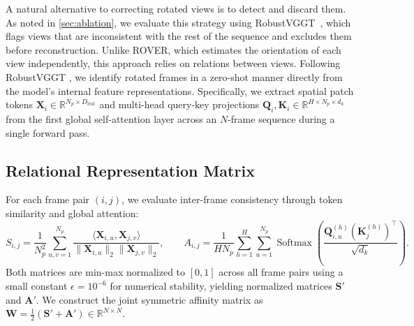 A natural alternative to correcting rotated views is to detect and discard them. As noted in \cref{sec:ablation}, we evaluate this strategy using RobustVGGT~\citep{robustvggt}, which flags views that are inconsistent with the rest of the sequence and excludes them before reconstruction. Unlike ROVER, which estimates the orientation of each view independently, this approach relies on relations between views. Following  RobustVGGT , we identify rotated frames in a zero-shot manner directly from the model's internal feature representations. Specifically, we extract spatial patch tokens $\mathbf{X}_i \in \mathbb{R}^{N_p \times D_{\text{feat}}}$ and multi-head query-key projections $\mathbf{Q}_i, \mathbf{K}_i \in \mathbb{R}^{H \times N_p \times d_k}$ from the first global self-attention layer across an $N$-frame sequence during a single forward pass.

\subsection{Relational Representation Matrix}
For each frame pair $(i, j)$, we evaluate inter-frame consistency through token similarity and global attention:
\begin{equation}
S_{i,j} = \frac{1}{N_p^2} \sum_{u,v=1}^{N_p} \frac{\langle \mathbf{X}_{i,u}, \mathbf{X}_{j,v} \rangle}{\|\mathbf{X}_{i,u}\|_2 \|\mathbf{X}_{j,v}\|_2}, \qquad
A_{i,j} = \frac{1}{H N_p} \sum_{h=1}^{H} \sum_{u=1}^{N_p} \operatorname{Softmax}\left( \frac{\mathbf{Q}_{i,u}^{(h)} (\mathbf{K}_j^{(h)})^\top}{\sqrt{d_k}} \right).
\end{equation}
Both matrices are min-max normalized to $[0, 1]$ across all frame pairs using a small constant $\epsilon = 10^{-6}$ for numerical stability, yielding normalized matrices $\mathbf{S}'$ and $\mathbf{A}'$. We construct the joint symmetric affinity matrix as $\mathbf{W} = \frac{1}{2}(\mathbf{S}' + \mathbf{A}') \in \mathbb{R}^{N \times N}$.

